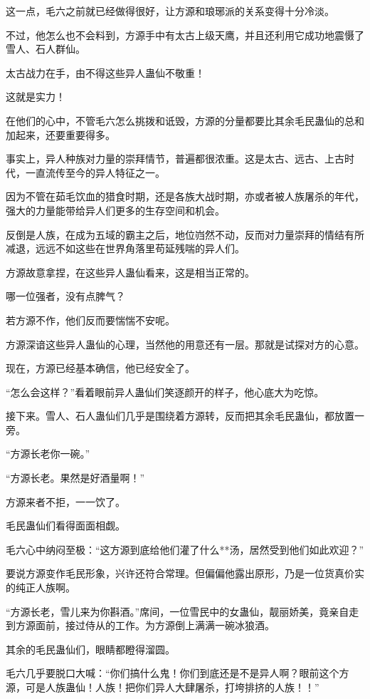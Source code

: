 \begin{this_body}
这一点，毛六之前就已经做得很好，让方源和琅琊派的关系变得十分冷淡。

不过，他怎么也不会料到，方源手中有太古上级天鹰，并且还利用它成功地震慑了雪人、石人群仙。

太古战力在手，由不得这些异人蛊仙不敬重！

这就是实力！

在他们的心中，不管毛六怎么挑拨和诋毁，方源的分量都要比其余毛民蛊仙的总和加起来，还要重要得多。

事实上，异人种族对力量的崇拜情节，普遍都很浓重。这是太古、远古、上古时代，一直流传至今的异人特征之一。

因为不管在茹毛饮血的猎食时期，还是各族大战时期，亦或者被人族屠杀的年代，强大的力量能带给异人们更多的生存空间和机会。

反倒是人族，在成为五域的霸主之后，地位岿然不动，反而对力量崇拜的情结有所减退，远远不如这些在世界角落里苟延残喘的异人们。

方源故意拿捏，在这些异人蛊仙看来，这是相当正常的。

哪一位强者，没有点脾气？

若方源不作，他们反而要惴惴不安呢。

方源深谙这些异人蛊仙的心理，当然他的用意还有一层。那就是试探对方的心意。

现在，方源已经基本确信，他已经安全了。

“怎么会这样？”看着眼前异人蛊仙们笑逐颜开的样子，他心底大为吃惊。

接下来。雪人、石人蛊仙们几乎是围绕着方源转，反而把其余毛民蛊仙，都放置一旁。

“方源长老你一碗。”

“方源长老。果然是好酒量啊！”

方源来者不拒，一一饮了。

毛民蛊仙们看得面面相觑。

毛六心中纳闷至极：“这方源到底给他们灌了什么**汤，居然受到他们如此欢迎？”

要说方源变作毛民形象，兴许还符合常理。但偏偏他露出原形，乃是一位货真价实的纯正人族啊。

“方源长老，雪儿来为你斟酒。”席间，一位雪民中的女蛊仙，靓丽娇美，竟亲自走到方源面前，接过侍从的工作。为方源倒上满满一碗冰狼酒。

其余的毛民蛊仙们，眼睛都瞪得溜圆。

毛六几乎要脱口大喊：“你们搞什么鬼！你们到底还是不是异人啊？眼前这个方源，可是人族蛊仙！人族！把你们异人大肆屠杀，打垮排挤的人族！！”


\end{this_body}
